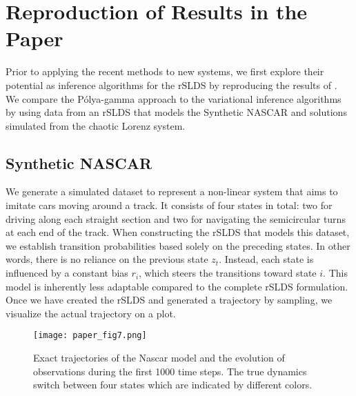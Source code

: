 
\section{Reproduction of Results in the Paper}

Prior to applying the recent methods to new systems, we first explore their potential as inference algorithms for the rSLDS by reproducing the results of \cite{linderman_bayesian_2017}. We compare the Pólya-gamma approach to the variational inference algorithms by using data from an rSLDS that models the Synthetic NASCAR and solutions simulated from the chaotic Lorenz system.

\subsection{Synthetic NASCAR}

We generate a simulated dataset to represent a non-linear system that aims to imitate cars moving around a track. It consists of four states in total: two for driving along each straight section and two for navigating the semicircular turns at each end of the track. When constructing the rSLDS that models this dataset, we establish transition probabilities based solely on the preceding states. In other words, there is no reliance on the previous state $z_t$. Instead, each state is influenced by a constant bias $r_i$, which steers the transitions toward state $i$. This model is inherently less adaptable compared to the complete rSLDS formulation. Once we have created the rSLDS and generated a trajectory by sampling, we visualize the actual trajectory on a plot.
\begin{figure}[h!]
	\centering
	\texttt{[image: paper\_fig7.png]}
	\caption{Exact trajectories of the Nascar model and the evolution of observations during the first 1000 time steps. The true dynamics switch between four states which are indicated by different colors.}
	\label{trueNascar}
\end{figure}

